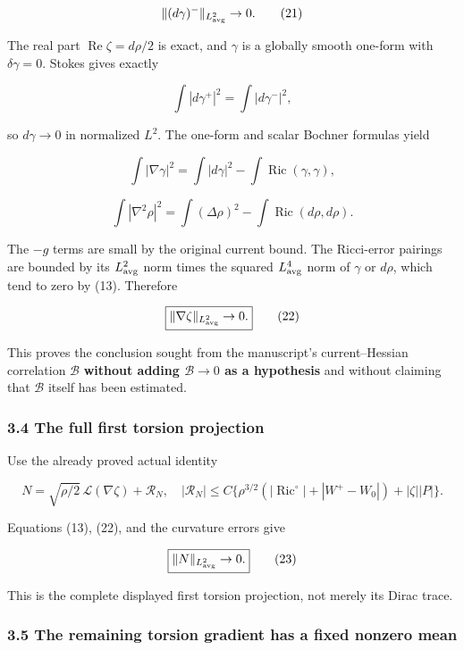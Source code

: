 \documentclass[11pt]{article}
\begin{document}
\[
 \|(d\gamma)^-\|_{L^2_{\rm avg}}\to0.
\tag{21}
\]

The real part \(\operatorname{Re}\zeta=d\rho/2\) is exact, and
\(\gamma\) is a globally smooth one-form with \(\delta\gamma=0\). Stokes
gives exactly

\[
 \int|d\gamma^+|^2=\int|d\gamma^-|^2,
\]

so \(d\gamma\to0\) in normalized \(L^2\). The one-form and scalar
Bochner formulas yield

\[
 \int|\nabla\gamma|^2
 =\int|d\gamma|^2-\int\operatorname{Ric}(\gamma,\gamma),
\]

\[
 \int|\nabla^2\rho|^2
 =\int(\Delta\rho)^2-\int\operatorname{Ric}(d\rho,d\rho).
\]

The \(-g\) terms are small by the original current bound. The
Ricci-error pairings are bounded by its \(L^2_{\rm avg}\) norm times the
squared \(L^4_{\rm avg}\) norm of \(\gamma\) or \(d\rho\), which tend to
zero by (13). Therefore

\[
 \boxed{\|\nabla\zeta\|_{L^2_{\rm avg}}\to0.}\tag{22}
\]

This proves the conclusion sought from the manuscript's current--Hessian
correlation \(\mathcal B\) \textbf{without adding \(\mathcal B\to0\) as
a hypothesis} and without claiming that \(\mathcal B\) itself has been
estimated.

\hypertarget{the-full-first-torsion-projection}{%
\subsubsection{3.4 The full first torsion
projection}\label{the-full-first-torsion-projection}}

Use the already proved actual identity

\[
 N=\sqrt{\rho/2}\,\mathcal L(\nabla\zeta)+\mathcal R_N,
\quad
 |\mathcal R_N|\le C\{\rho^{3/2}(
 |\operatorname{Ric}^{\circ}|+|W^+-W_0|)+|\zeta||P|\}.
\]

Equations (13), (22), and the curvature errors give

\[
 \boxed{\|N\|_{L^2_{\rm avg}}\to0.}\tag{23}
\]

This is the complete displayed first torsion projection, not merely its
Dirac trace.

\hypertarget{the-remaining-torsion-gradient-has-a-fixed-nonzero-mean}{%
\subsubsection{3.5 The remaining torsion gradient has a fixed nonzero
mean}\label{the-remaining-torsion-gradient-has-a-fixed-nonzero-mean}}
\end{document}
